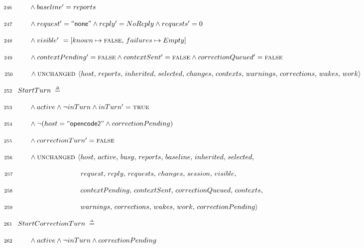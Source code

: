 \documentclass{article}
\makeatletter
\newcommand{\defeq}{\;\mathrel{\smash   %
    {{\stackrel{\scriptscriptstyle\Delta}{=}}}}\;}
\newcommand{\FALSE}{\textsc{false}}
\newcommand{\TRUE}{\textsc{true}}
\newcommand{\UNCHANGED}{\textsc{unchanged }}
\renewcommand{\_}{\rule{.4em}{.06em}\hspace{.05em}}
\newif\ifpcalshading \pcalshadingfalse
\newlength{\pcalvspace}\setlength{\pcalvspace}{0pt}%
\newcommand{\@pvspace}[1]{%
  \ifpcalshading
     \par\global\setlength{\pcalvspace}{#1}%
  \else
     \par\vspace{#1}%
  \fi
}
\renewcommand{\.}[1]{\ensuremath{\mbox{}#1\mbox{}}}
\newcommand{\@s}[1]{\hspace{#1pt}}
\newlength{\@xlen}
\newcommand\xtstrut%
  {\setlength{\@xlen}{1.05em}%
   \addtolength{\@xlen}{\pcalvspace}%
    \raisebox{\vshadelen}{\raisebox{-.25em}{\rule{0pt}{\@xlen}}}%
   \global\setlength{\vshadelen}{0pt}%
   \global\setlength{\pcalvspace}{0pt}}
\newcommand{\@x}[1]{\par
  \ifpcalshading
  \makebox[0pt][l]{\shadebox{\xtstrut\hspace*{\textwidth}}}%
  \fi
  \mbox{$\mbox{}#1\mbox{}$}}
\newcommand{\@w}[1]{\textsf{``{#1}''}}
\def\graymargin{1}
\newlength{\templena}
\newlength{\templenb}
\newcommand{\shadebox}[1]{{\setlength{\fboxsep}{\graymargin pt}%
     \savebox{\tempboxa}{#1}%
     \settoheight{\templena}{\usebox{\tempboxa}}%
     \settodepth{\templenb}{\usebox{\tempboxa}}%
     \hspace*{-\fboxsep}\raisebox{0pt}[\templena][\templenb]%
        {\colorbox{boxshade}{\usebox{\tempboxa}}}\hspace*{-\fboxsep}}}
\newlength{\vshadelen}
\makeatother
\begin{document}
 \@x{\makebox[0pt][r]{\scriptsize 246\hspace{1em}}\@s{16.4} \.{\land} baseline
 \.{'} \.{=} reports}%
 \@x{\makebox[0pt][r]{\scriptsize 247\hspace{1em}}\@s{16.4} \.{\land} request
 \.{'} \.{=}\@w{none} \.{\land} reply \.{'} \.{=} NoReply \.{\land} requests
 \.{'} \.{=} 0}%
 \@x{\makebox[0pt][r]{\scriptsize 248\hspace{1em}}\@s{16.4} \.{\land} visible
 \.{'}\@s{3.39} \.{=} [ known \.{\mapsto} {\FALSE} ,\, failures \.{\mapsto}
 Empty ]}%
 \@x{\makebox[0pt][r]{\scriptsize 249\hspace{1em}}\@s{16.4} \.{\land}
 contextPending \.{'} \.{=} {\FALSE} \.{\land} contextSent \.{'} \.{=}
 {\FALSE} \.{\land} correctionQueued \.{'} \.{=} {\FALSE}}%
 \@x{\makebox[0pt][r]{\scriptsize 250\hspace{1em}}\@s{16.4} \.{\land}
 {\UNCHANGED} {\langle} host ,\, reports ,\, inherited ,\, selected ,\,
 changes ,\, contexts ,\, warnings ,\, corrections ,\, wakes ,\, work
 {\rangle}}%
\@pvspace{8.0pt}%
\@x{\makebox[0pt][r]{\scriptsize 252\hspace{1em}} StartTurn \.{\defeq}}%
 \@x{\makebox[0pt][r]{\scriptsize 253\hspace{1em}}\@s{16.4} \.{\land} active
 \.{\land} {\lnot} inTurn \.{\land} inTurn \.{'} \.{=} {\TRUE}}%
 \@x{\makebox[0pt][r]{\scriptsize 254\hspace{1em}}\@s{16.4} \.{\land} {\lnot}
 ( host \.{=}\@w{opencode2} \.{\land} correctionPending )}%
 \@x{\makebox[0pt][r]{\scriptsize 255\hspace{1em}}\@s{16.4} \.{\land}
 correctionTurn \.{'} \.{=} {\FALSE}}%
 \@x{\makebox[0pt][r]{\scriptsize 256\hspace{1em}}\@s{16.4} \.{\land}
 {\UNCHANGED} {\langle} host ,\, active ,\, busy ,\, reports ,\, baseline ,\,
 inherited ,\, selected ,\,}%
 \@x{\makebox[0pt][r]{\scriptsize 257\hspace{1em}}\@s{89.98} request ,\, reply
 ,\, requests ,\, changes ,\, session ,\, visible ,\,}%
 \@x{\makebox[0pt][r]{\scriptsize 258\hspace{1em}}\@s{89.98} contextPending
 ,\, contextSent ,\, correctionQueued ,\, contexts ,\,}%
 \@x{\makebox[0pt][r]{\scriptsize 259\hspace{1em}}\@s{89.98} warnings ,\,
 corrections ,\, wakes ,\, work ,\, correctionPending {\rangle}}%
\@pvspace{8.0pt}%
 \@x{\makebox[0pt][r]{\scriptsize 261\hspace{1em}} StartCorrectionTurn
 \.{\defeq}}%
 \@x{\makebox[0pt][r]{\scriptsize 262\hspace{1em}}\@s{16.4} \.{\land} active
 \.{\land} {\lnot} inTurn \.{\land} correctionPending}%
\end{document}
